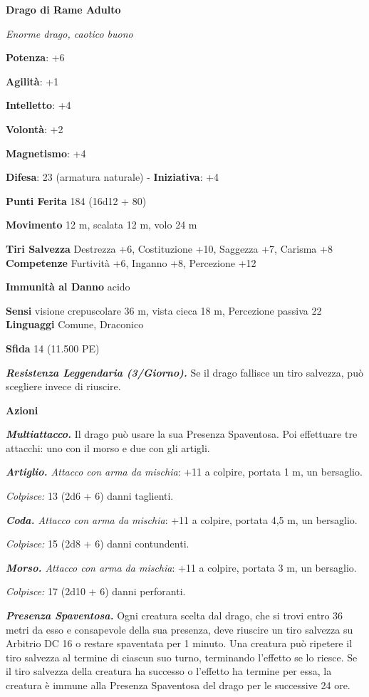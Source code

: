 \begin{multicols}{2}
\textbf{Drago di Rame Adulto}

\emph{Enorme drago, caotico buono}

\textbf{Potenza}: +6

\textbf{Agilità}: +1

\textbf{Intelletto}: +4

\textbf{Volontà}: +2

\textbf{Magnetismo}: +4

\textbf{Difesa}: 23 (armatura naturale) - \textbf{Iniziativa}: +4

\textbf{Punti Ferita} 184 (16d12 + 80)

\textbf{Movimento} 12 m, scalata 12 m, volo 24 m

\textbf{Tiri Salvezza} Destrezza +6, Costituzione +10, Saggezza +7,
Carisma +8 \textbf{Competenze} Furtività +6, Inganno +8, Percezione +12

\textbf{Immunità al Danno} acido

\textbf{Sensi} visione crepuscolare 36 m, vista cieca 18 m, Percezione passiva
22 \textbf{Linguaggi} Comune, Draconico

\textbf{Sfida} 14 (11.500 PE)\smallskip

\emph{\textbf{Resistenza Leggendaria (3/Giorno).}} Se il drago fallisce
un tiro salvezza, può scegliere invece di riuscire.

\smallskip\textbf{Azioni}

\emph{\textbf{Multiattacco.}} Il drago può usare la sua Presenza
Spaventosa. Poi effettuare tre attacchi: uno con il morso e due con gli
artigli.

\emph{\textbf{Artiglio.} Attacco con arma da mischia}: +11 a colpire,
portata 1 m, un bersaglio.

\emph{Colpisce:} 13 (2d6 + 6) danni taglienti.

\emph{\textbf{Coda.} Attacco con arma da mischia}: +11 a colpire,
portata 4,5 m, un bersaglio.

\emph{Colpisce:} 15 (2d8 + 6) danni contundenti.

\emph{\textbf{Morso.} Attacco con arma da mischia}: +11 a colpire,
portata 3 m, un bersaglio.

\emph{Colpisce:} 17 (2d10 + 6) danni perforanti.

\emph{\textbf{Presenza Spaventosa.}} Ogni creatura scelta dal drago, che
si trovi entro 36 metri da esso e consapevole della sua presenza, deve
riuscire un tiro salvezza su Arbitrio DC 16 o restare spaventata per 1
minuto. Una creatura può ripetere il tiro salvezza al termine di ciascun
suo turno, terminando l'effetto se lo riesce. Se il tiro salvezza della
creatura ha successo o l'effetto ha termine per essa, la creatura è
immune alla Presenza Spaventosa del drago per le successive 24 ore.


\end{multicols}
